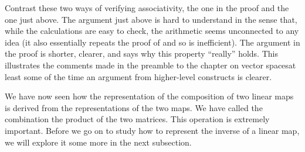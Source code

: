 \begin{remark}
Contrast these two ways of verifying associativity, the one in the proof and
the one just above.
The argument just above is hard to understand in the sense that, while
the calculations are easy to check, the arithmetic seems unconnected to any
idea (it also essentially repeats the proof of
 and so is inefficient).
The argument in the proof 
is shorter, clearer, and says why this property ``really'' holds.
This illustrates the comments made in the preamble 
to the chapter on vector spaces\Dash at
least some of the time an argument from higher-level constructs is clearer.
\end{remark}

We have now seen how the representation of the composition of two linear maps
is derived from the representations of the two maps.
We have called the combination the product of the two matrices.
This operation is extremely important.
Before we go on to study how to represent the inverse of a linear map, we
will explore it some more in the next subsection.

